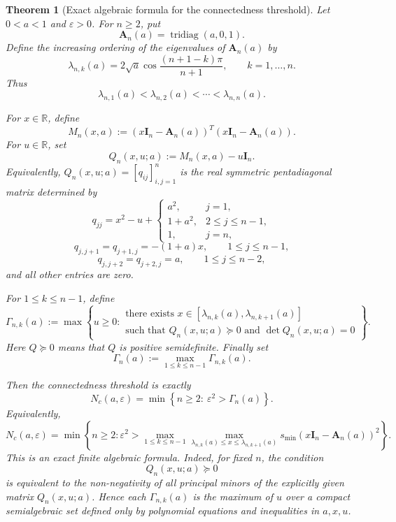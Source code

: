 \documentclass[11pt]{article}
\newtheorem{theorem}{Theorem}
\DeclareMathOperator{\tridiag}{tridiag}
\newcommand{\A}{\mathbf A}
\newcommand{\I}{\mathbf I}
\newcommand{\R}{\mathbb R}
\newcommand{\eps}{\varepsilon}
\begin{document}
\begin{theorem}[Exact algebraic formula for the connectedness threshold]
Let \(0<a<1\) and \(\eps>0\). For \(n\ge2\), put
\[
\A_n(a)=\tridiag(a,0,1).
\]
Define the increasing ordering of the eigenvalues of \(\A_n(a)\) by
\[
\lambda_{n,k}(a)
=
2\sqrt a\cos\frac{(n+1-k)\pi}{n+1},
\qquad k=1,\dots,n.
\]
Thus
\[
\lambda_{n,1}(a)<\lambda_{n,2}(a)<\cdots<\lambda_{n,n}(a).
\]

For \(x\in\R\), define
\[
M_n(x,a):=(x\I_n-\A_n(a))^T(x\I_n-\A_n(a)).
\]
For \(u\in\R\), set
\[
Q_n(x,u;a):=M_n(x,a)-u\I_n.
\]
Equivalently, \(Q_n(x,u;a)=[q_{ij}]_{i,j=1}^n\) is the real symmetric pentadiagonal matrix determined by
\[
q_{jj}
=
x^2-u+
\begin{cases}
a^2, & j=1,\\
1+a^2, & 2\le j\le n-1,\\
1, & j=n,
\end{cases}
\]
\[
q_{j,j+1}=q_{j+1,j}=-(1+a)x,
\qquad 1\le j\le n-1,
\]
\[
q_{j,j+2}=q_{j+2,j}=a,
\qquad 1\le j\le n-2,
\]
and all other entries are zero.

For \(1\le k\le n-1\), define
\[
\Gamma_{n,k}(a)
:=
\max
\left\{
u\ge0:
\begin{array}{l}
\text{there exists }x\in[\lambda_{n,k}(a),\lambda_{n,k+1}(a)]\\[2mm]
\text{such that }Q_n(x,u;a)\succeq0
\text{ and }\det Q_n(x,u;a)=0
\end{array}
\right\}.
\]
Here \(Q\succeq0\) means that \(Q\) is positive semidefinite. Finally set
\[
\Gamma_n(a):=\max_{1\le k\le n-1}\Gamma_{n,k}(a).
\]

Then the connectedness threshold is exactly
\[
\boxed{
N_c(a,\eps)
=
\min\left\{
n\ge2:\ \eps^2>\Gamma_n(a)
\right\}.
}
\]
Equivalently,
\[
\boxed{
N_c(a,\eps)
=
\min\left\{
n\ge2:
\eps^2>
\max_{1\le k\le n-1}
\max_{\lambda_{n,k}(a)\le x\le\lambda_{n,k+1}(a)}
s_{\min}\!\left(x\I_n-\A_n(a)\right)^2
\right\}.
}
\]
This is an exact finite algebraic formula. Indeed, for fixed \(n\), the condition
\[
Q_n(x,u;a)\succeq0
\]
is equivalent to the non-negativity of all principal minors of the explicitly given matrix \(Q_n(x,u;a)\). Hence each \(\Gamma_{n,k}(a)\) is the maximum of \(u\) over a compact semialgebraic set defined only by polynomial equations and inequalities in \(a,x,u\).
\end{theorem}
\end{document}
